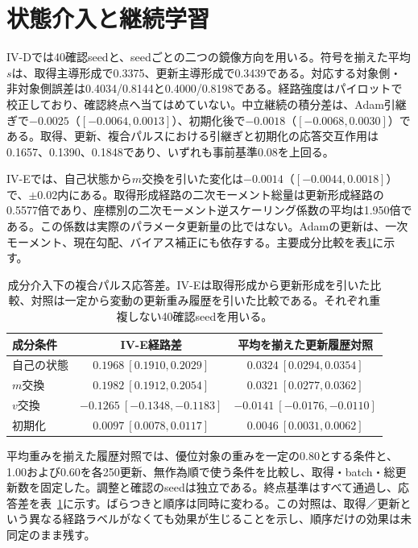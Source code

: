 \section{状態介入と継続学習}
\label{app:optimizer}
IV-Dでは40確認seedと、seedごとの二つの鏡像方向を用いる。符号を揃えた平均$s$は、取得主導形成で0.3375、更新主導形成で0.3439である。対応する対象側・非対象側誤差は0.4034/0.8144と0.4000/0.8198である。経路強度はパイロットで校正しており、確認終点へ当てはめていない。中立継続の積分差は、Adam引継ぎで$-0.0025$（$[-0.0064,0.0013]$）、初期化後で$-0.0018$（$[-0.0068,0.0030]$）である。取得、更新、複合パルスにおける引継ぎと初期化の応答交互作用は0.1657、0.1390、0.1848であり、いずれも事前基準0.08を上回る。

IV-Eでは、自己状態から$m$交換を引いた変化は$-0.0014$（$[-0.0044,0.0018]$）で、$\pm0.02$内にある。取得形成経路の二次モーメント総量は更新形成経路の0.5577倍であり、座標別の二次モーメント逆スケーリング係数の平均は1.950倍である。この係数は実際のパラメータ更新量の比ではない。Adamの更新は、一次モーメント、現在勾配、バイアス補正にも依存する。主要成分比較を表\ref{tab:components}に示す。

\begin{table}[h]
\centering\small
\caption{成分介入下の複合パルス応答差。IV-Eは取得形成から更新形成を引いた比較、対照は一定から変動の更新重み履歴を引いた比較である。それぞれ重複しない40確認seedを用いる。}
\label{tab:components}
\begin{tabular}{lcc}
\toprule
成分条件 & IV-E経路差 & 平均を揃えた更新履歴対照\\
\midrule
自己の状態 & $0.1968\ [0.1910,0.2029]$ & $0.0324\ [0.0294,0.0354]$\\
$m$交換 & $0.1982\ [0.1912,0.2054]$ & $0.0321\ [0.0277,0.0362]$\\
$v$交換 & $-0.1265\ [-0.1348,-0.1183]$ & $-0.0141\ [-0.0176,-0.0110]$\\
初期化 & $0.0097\ [0.0078,0.0117]$ & $0.0046\ [0.0031,0.0062]$\\
\bottomrule
\end{tabular}
\end{table}

平均重みを揃えた履歴対照では、優位対象の重みを一定の0.80とする条件と、1.00および0.60を各250更新、無作為順で使う条件を比較し、取得・batch・総更新数を固定した。調整と確認のseedは独立である。終点基準はすべて通過し、応答差を表~\ref{tab:components}に示す。ばらつきと順序は同時に変わる。この対照は、取得／更新という異なる経路ラベルがなくても効果が生じることを示し、順序だけの効果は未同定のまま残す。


